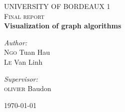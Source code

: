 \begin{titlepage}
\begin{center}
\textsc{\LARGE UNIVERSITY OF BORDEAUX 1}\\[1.5cm]
\textsc{\Large Final report}\\[0.5cm]

{\huge \bfseries Visualization of graph algorithms \\[2cm] }

\noindent
\begin{minipage}{0.4\textwidth}
\begin{flushleft}\large
\emph{Author:}\\
\textsc{Ngo} Tuan Hau\\
\textsc{Le} Van Linh
\end{flushleft}
\end{minipage}
\begin{minipage}{0.4\textwidth}
\begin{flushright}\large
\emph{Supervisor:}\\
\textsc{olivier} Baudon\\
\end{flushright}
\end{minipage}
\vfill
{\large \today}
\end{center}
\end{titlepage}